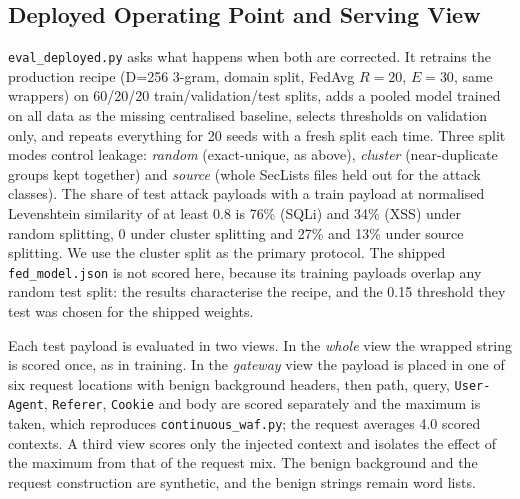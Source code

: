 \subsection{Deployed Operating Point and Serving View}
\label{sec:eval-deployed}

\texttt{eval\_deployed.py} asks what happens when both are corrected. It retrains the production recipe (D=256 3-gram, domain split, FedAvg $R{=}20$, $E{=}30$, same wrappers) on 60/20/20 train/validation/test splits, adds a pooled model trained on all data as the missing centralised baseline, selects thresholds on validation only, and repeats everything for 20 seeds with a fresh split each time. Three split modes control leakage: \emph{random} (exact-unique, as above), \emph{cluster} (near-duplicate groups kept together) and \emph{source} (whole SecLists files held out for the attack classes). The share of test attack payloads with a train payload at normalised Levenshtein similarity of at least 0.8 is 76\% (SQLi) and 34\% (XSS) under random splitting, 0 under cluster splitting and 27\% and 13\% under source splitting. We use the cluster split as the primary protocol. The shipped \texttt{fed\_model.json} is not scored here, because its training payloads overlap any random test split: the results characterise the recipe, and the 0.15 threshold they test was chosen for the shipped weights.

Each test payload is evaluated in two views. In the \emph{whole} view the wrapped string is scored once, as in training. In the \emph{gateway} view the payload is placed in one of six request locations with benign background headers, then path, query, \texttt{User-Agent}, \texttt{Referer}, \texttt{Cookie} and body are scored separately and the maximum is taken, which reproduces \texttt{continuous\_waf.py}; the request averages 4.0 scored contexts. A third view scores only the injected context and isolates the effect of the maximum from that of the request mix. The benign background and the request construction are synthetic, and the benign strings remain word lists.


